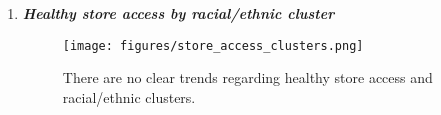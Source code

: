\documentclass{article}
\begin{document}
\begin{itemize}[leftmargin=0pt]
\begin{enumerate}
    \pagebreak
    \item \textbf{\textit{Healthy store access by racial/ethnic cluster}}
            \label{fig:cluster_store_access}
        \begin{figure}[h!]
            \centering
            \texttt{[image: figures/store\_access\_clusters.png]}
            \caption{There are no clear trends regarding healthy store access and racial/ethnic clusters.}
        \end{figure}
\end{enumerate}

\end{itemize}
\end{document}
